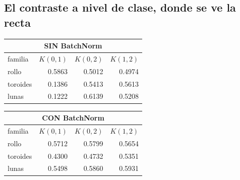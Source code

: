\documentclass[11pt,a4paper]{article}
\begin{document}
\subsection{El contraste a nivel de clase, donde se ve la recta}
\noindent
\begin{minipage}[t]{0.49\textwidth}
  \centering
  \footnotesize\setlength{\tabcolsep}{3pt}
  \begin{tabular}{lrrr}
      \multicolumn{4}{c}{\textbf{SIN BatchNorm}} \\[2pt]
      \toprule
      familia & $K(0,1)$ & $K(0,2)$ & $K(1,2)$ \\
      \midrule
      rollo & 0.5863 & 0.5012 & 0.4974 \\
      toroides & 0.1386 & 0.5413 & 0.5613 \\
      lunas & 0.1222 & 0.6139 & 0.5208 \\
      \bottomrule
    \end{tabular}
\end{minipage}\hfill
\begin{minipage}[t]{0.49\textwidth}
  \centering
  \footnotesize\setlength{\tabcolsep}{3pt}
  \begin{tabular}{lrrr}
      \multicolumn{4}{c}{\textbf{CON BatchNorm}} \\[2pt]
      \toprule
      familia & $K(0,1)$ & $K(0,2)$ & $K(1,2)$ \\
      \midrule
      rollo & 0.5712 & 0.5799 & 0.5654 \\
      toroides & 0.4300 & 0.4732 & 0.5351 \\
      lunas & 0.5498 & 0.5860 & 0.5931 \\
      \bottomrule
    \end{tabular}
\end{minipage}
\vspace{11pt}
\end{document}
